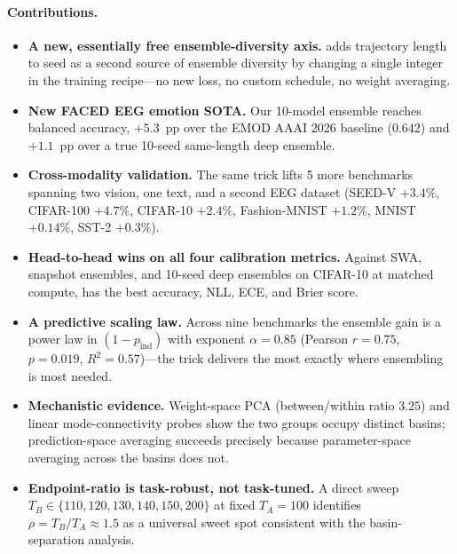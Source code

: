\paragraph{Contributions.}
\begin{itemize}[leftmargin=*]
\item \textbf{A new, essentially free ensemble-diversity axis.} \ours{}
adds trajectory length to seed as a second source of ensemble diversity
by changing a single integer in the training recipe---no new loss, no
custom schedule, no weight averaging.
\item \textbf{New FACED EEG emotion SOTA.} Our 10-model \ours{} ensemble
reaches \facedacc{} balanced accuracy, $+5.3$~pp over the EMOD AAAI 2026
baseline ($0.642$) and $+1.1$~pp over a true 10-seed same-length deep
ensemble.
\item \textbf{Cross-modality validation.} The same trick lifts 5 more
benchmarks spanning two vision, one text, and a second EEG dataset
(SEED-V $+3.4\%$, CIFAR-100 $+4.7\%$, CIFAR-10 $+2.4\%$, Fashion-MNIST
$+1.2\%$, MNIST $+0.14\%$, SST-2 $+0.3\%$).
\item \textbf{Head-to-head wins on all four calibration metrics.} Against
SWA, snapshot ensembles, and 10-seed deep ensembles on CIFAR-10 at matched
compute, \ours{} has the best accuracy, NLL, ECE, and Brier score.
\item \textbf{A predictive scaling law.} Across nine benchmarks the
ensemble gain is a power law in $(1 - p_{\mathrm{ind}})$ with exponent
$\alpha=0.85$ (Pearson $r=0.75$, $p=0.019$, $R^2=0.57$)---the trick
delivers the most exactly where ensembling is most needed.
\item \textbf{Mechanistic evidence.} Weight-space PCA (between/within
ratio $3.25$) and linear mode-connectivity probes show the two groups
occupy distinct basins; prediction-space averaging succeeds precisely
because parameter-space averaging across the basins does not.
\item \textbf{Endpoint-ratio is task-robust, not task-tuned.} A direct
sweep $T_B \in \{110, 120, 130, 140, 150, 200\}$ at fixed $T_A=100$
identifies $\rho = T_B/T_A \approx 1.5$ as a universal sweet spot
consistent with the basin-separation analysis.
\end{itemize}
